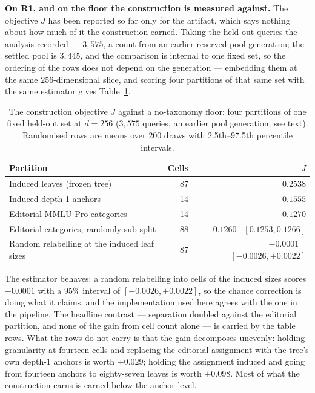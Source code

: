 \textbf{On R1, and on the floor the construction is measured against.}
The objective $J$ has been reported so far only for the artifact, which
says nothing about how much of it the construction earned. Taking the
held-out queries the analysis recorded --- $3{,}575$, a count from an
earlier reserved-pool generation; the settled pool is $3{,}445$, and
the comparison is internal to one fixed set, so the ordering of the
rows does not depend on the generation --- embedding them at the same
$256$-dimensional slice, and scoring four partitions of that same set
with the same estimator gives Table~\ref{tab:j-floor}.

\begin{table}[htbp]
\centering
\small
\caption{The construction objective $J$ against a no-taxonomy floor:
four partitions of one fixed held-out set at $d = 256$ ($3{,}575$
queries, an earlier pool generation; see text). Randomised rows are
means over 200 draws with 2.5th--97.5th percentile intervals.}
\label{tab:j-floor}
\begin{tabular}{lrr}
\toprule
Partition & Cells & $J$ \\
\midrule
Induced leaves (frozen tree) & 87 & $0.2538$ \\
Induced depth-1 anchors & 14 & $0.1555$ \\
Editorial MMLU-Pro categories & 14 & $0.1270$ \\
Editorial categories, randomly sub-split & 88 & $0.1260$ \ \small $[0.1253, 0.1266]$ \\
Random relabelling at the induced leaf sizes & 87 & $-0.0001$ \ \small $[-0.0026, +0.0022]$ \\
\bottomrule
\end{tabular}
\end{table}

The estimator behaves: a random relabelling into cells of the induced
sizes scores $-0.0001$ with a $95\%$ interval of $[-0.0026, +0.0022]$,
so the chance correction is doing what it claims, and the
implementation used here agrees with the one in the pipeline. The
headline contrast --- separation doubled against the editorial
partition, and none of the gain from cell count alone --- is carried
by the table rows. What the rows do not carry is that the gain
decomposes unevenly: holding granularity at fourteen cells and
replacing the editorial assignment with the tree's own depth-1
anchors is worth $+0.029$; holding the assignment induced and going
from fourteen anchors to eighty-seven leaves is worth $+0.098$. Most
of what the construction earns is earned below the anchor level.

